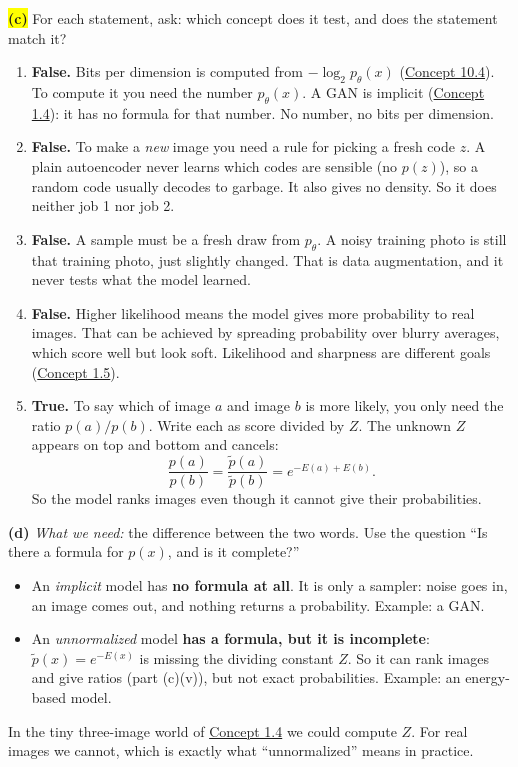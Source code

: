 \documentclass[12pt,a4paper]{article}
\begin{document}
\colorbox{yellow}{\textbf{(c)}} For each statement, ask: which concept does it test, and does the statement match it?
\begin{enumerate}[label=(\roman*),nosep]
  \item \textbf{False.} Bits per dimension is computed from $-\log_2 p_\theta(x)$ (\hyperref[c10-4]{Concept 10.4}). To compute it you need the number $p_\theta(x)$. A GAN is implicit (\hyperref[c1-4]{Concept 1.4}): it has no formula for that number. No number, no bits per dimension.
  \item \textbf{False.} To make a \emph{new} image you need a rule for picking a fresh code $z$. A plain autoencoder never learns which codes are sensible (no $p(z)$), so a random code usually decodes to garbage. It also gives no density. So it does neither job 1 nor job 2.
  \item \textbf{False.} A sample must be a fresh draw from $p_\theta$. A noisy training photo is still that training photo, just slightly changed. That is data augmentation, and it never tests what the model learned.
  \item \textbf{False.} Higher likelihood means the model gives more probability to real images. That can be achieved by spreading probability over blurry averages, which score well but look soft. Likelihood and sharpness are different goals (\hyperref[c1-5]{Concept 1.5}).
  \item \textbf{True.} To say which of image $a$ and image $b$ is more likely, you only need the ratio $p(a)/p(b)$. Write each as score divided by $Z$. The unknown $Z$ appears on top and bottom and cancels:
  \[
  \frac{p(a)}{p(b)}=\frac{\tilde p(a)}{\tilde p(b)}=e^{-E(a)+E(b)}.
  \]
  So the model ranks images even though it cannot give their probabilities.
\end{enumerate}

\textbf{(d)} \emph{What we need:} the difference between the two words. Use the question ``Is there a formula for $p(x)$, and is it complete?''
\begin{itemize}[nosep]
  \item An \emph{implicit} model has \textbf{no formula at all}. It is only a sampler: noise goes in, an image comes out, and nothing returns a probability. Example: a GAN.
  \item An \emph{unnormalized} model \textbf{has a formula, but it is incomplete}: $\tilde p(x)=e^{-E(x)}$ is missing the dividing constant $Z$. So it can rank images and give ratios (part (c)(v)), but not exact probabilities. Example: an energy-based model.
\end{itemize}
In the tiny three-image world of \hyperref[c1-4]{Concept 1.4} we could compute $Z$. For real images we cannot, which is exactly what ``unnormalized'' means in practice.
\newpage
\end{document}
